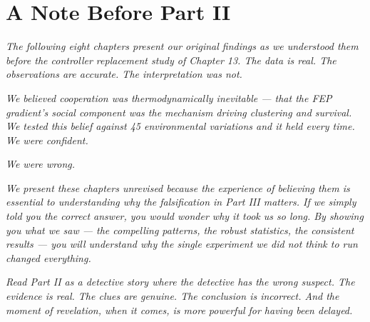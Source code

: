 \chapter{A Note Before Part II}\label{a-note-before-part-ii}

\emph{The following eight chapters present our original findings as we understood them before the controller replacement study of Chapter 13. The data is real. The observations are accurate. The interpretation was not.}

\emph{We believed cooperation was thermodynamically inevitable --- that the FEP gradient's social component was the mechanism driving clustering and survival. We tested this belief against 45 environmental variations and it held every time. We were confident.}

\emph{We were wrong.}

\emph{We present these chapters unrevised because the experience of believing them is essential to understanding why the falsification in Part III matters. If we simply told you the correct answer, you would wonder why it took us so long. By showing you what we saw --- the compelling patterns, the robust statistics, the consistent results --- you will understand why the single experiment we did not think to run changed everything.}

\emph{Read Part II as a detective story where the detective has the wrong suspect. The evidence is real. The clues are genuine. The conclusion is incorrect. And the moment of revelation, when it comes, is more powerful for having been delayed.}
